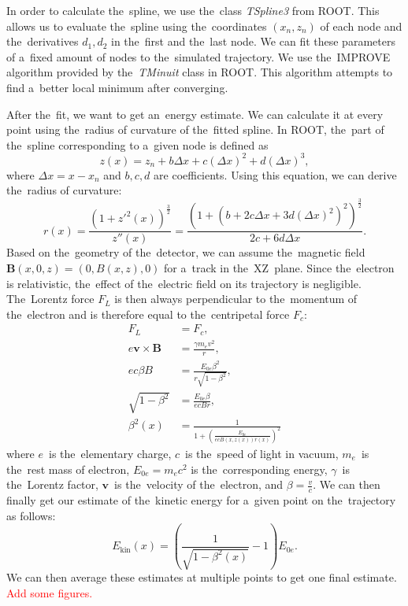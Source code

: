 		In order to calculate the~spline, we use the~class \textit{TSpline3} from ROOT. This allows us to evaluate the~spline using the~coordinates $(x_n,z_n)$ of each node and the~derivatives $d_1,d_2$ in the~first and the~last node. We can fit these parameters of a~fixed amount of nodes to the~simulated trajectory. We use the~IMPROVE algorithm provided by the~\textit{TMinuit} class in ROOT. This algorithm attempts to find a~better local minimum after converging.
		
		After the~fit, we want to get an~energy estimate. We can calculate it at every point using the~radius of curvature of the~fitted spline. In ROOT, the~part of the~spline corresponding to a~given node is defined as
			\begin{equation}
				z(x) = z_n + b \Delta x+c(\Delta x)^2+d(\Delta x)^3,
			\end{equation}
		where $\Delta x = x-x_n$ and $b,c,d$ are coefficients. Using this equation, we can derive the~radius of curvature:
			\begin{equation}
				r(x) = \frac{\left(1+z'^2(x)\right)^\frac{3}{2}}{z''(x)} = \frac{\left(1+\left(b+2c\Delta x+3d(\Delta x)^2\right)^2\right)^\frac{3}{2}}{2c+6d\Delta x}.
			\end{equation}
		Based on the~geometry of the~detector, we can assume the~magnetic field \linebreak$\bm{B}(x,0,z) = (0,B(x,z),0)$ for a~track in the~XZ~plane. Since the~electron is relativistic, the~effect of the~electric field on its trajectory is negligible. The~Lorentz force $F_L$ is then always perpendicular to the~momentum of the~electron and is therefore equal to the~centripetal force $F_c$:
			\begin{align}
				F_L &= F_c,\\
				e\bm{v}\times\bm{B} &= \frac{\gamma m_e v^2}{r},\\
				e c\beta B &= \frac{E_{0e} \beta^2}{r\sqrt{1-\beta^2}},\\
				\sqrt{1-\beta^2} &= \frac{E_{0e} \beta}{ecBr},\\
				\beta^2(x) &= \frac{1}{1+\left(\frac{E_{0e}}{ecB(x,z(x))r(x)}\right)^2} \label{eq:ekin1}
			\end{align}
		where $e$~is the~elementary charge, $c$~is the~speed of light in vacuum, $m_e$~is the~rest mass of electron, $E_{0e} = m_e c^2$ is the~corresponding energy, $\gamma$~is the~Lorentz factor, $\bm{v}$~is the~velocity of the~electron, and $\beta = \frac{v}{c}$. We can then finally get our estimate of the~kinetic energy for a~given point on the~trajectory as follows:
			\begin{equation}
				\label{eq:ekin2}
				E_\text{kin}(x) = \left(\frac{1}{\sqrt{1-\beta^2(x)}}-1\right)E_{0e}.
			\end{equation}
		We can then average these estimates at multiple points to get one final estimate.
		\textcolor{red}{Add some figures.}
		
